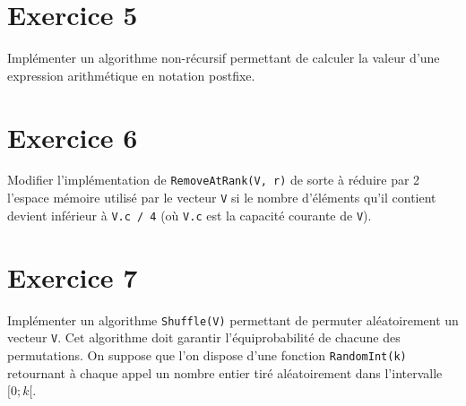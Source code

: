 \documentclass[a4paper,10pt]{article}
\begin{document}
\section*{Exercice 5}

Implémenter un algorithme non-récursif permettant de calculer la valeur d'une
expression arithmétique en notation postfixe.

\section*{Exercice 6}

Modifier l'implémentation de \texttt{RemoveAtRank(V, r)} de sorte à réduire par
2 l'espace mémoire utilisé par le vecteur \texttt{V} si le nombre d'éléments
qu'il contient devient inférieur à \texttt{V.c / 4} (où \texttt{V.c} est la capacité
courante de \texttt{V}).

\section*{Exercice 7}

Implémenter un algorithme \texttt{Shuffle(V)} permettant de permuter
aléatoirement un vecteur \texttt{V}. Cet algorithme doit garantir
l'équiprobabilité de chacune des permutations. On suppose que l'on dispose d'une
fonction \texttt{RandomInt(k)} retournant à chaque appel un nombre entier tiré
aléatoirement dans l'intervalle $[0; k[$.
\end{document}
